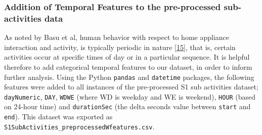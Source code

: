 \documentclass[11pt,]{article}
\begin{document}
\hypertarget{addition-of-temporal-features-to-the-pre-processed-sub-activities-data}{%
\subsubsection{Addition of Temporal Features to the pre-processed
sub-activities
data}\label{addition-of-temporal-features-to-the-pre-processed-sub-activities-data}}

As noted by Basu et al, human behavior with respect to home appliance
interaction and activity, is typically periodic in nature
{[}\protect\hyperlink{ref-kaustavbasuApplianceUsagePrediction2012}{15}{]},
that is, certain activities occur at specific times of day or in a
particular sequence. It is helpful therefore to add categorical temporal
features to our dataset, in order to inform further analysis. Using the
Python \texttt{pandas} and \texttt{datetime} packages, the following
features were added to all instances of the pre-processed S1 sub
activities dataset; \texttt{dayNumeric}, \texttt{DAY}, \texttt{WDWE}
(where WD is weekday and WE is weekend), \texttt{HOUR} (based on 24-hour
time) and \texttt{durationSec} (the delta seconds value between
\texttt{start} and \texttt{end}). This dataset was exported as
\texttt{S1SubActivities\_preprocessedWfeatures.csv}.
\end{document}
